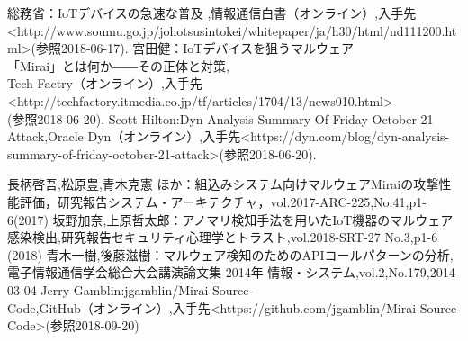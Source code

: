 
\begin{thebibliography}{10}
		総務省：IoTデバイスの急速な普及 ,情報通信白書（オンライン）,入手先\textless http://www.soumu.go.jp/johotsusintokei/whitepaper/ja/h30/html/nd111200.html\textgreater(参照2018-06-17).
        宮田健：IoTデバイスを狙うマルウェア\\「Mirai」とは何か――その正体と対策,\\Tech Factry（オンライン）,入手先\textless http:\slash\slash{}techfactory.itmedia.co.jp\slash{}tf\slash{}articles\slash{}1704\slash{}13\slash{}news010.html\textgreater\\(参照2018-06-20).
       Scott Hilton:Dyn Analysis Summary Of Friday October 21 Attack,Oracle Dyn（オンライン）,入手先\textless https:\slash\slash{}dyn.com\slash{}blog\slash{}dyn-analysis-summary-of-friday-october-21-attack\textgreater (参照2018-06-20).

    	長柄啓吾,松原豊,青木克憲 ほか：組込みシステム向けマルウェアMiraiの攻撃性能評価，研究報告システム・アーキテクチャ，vol.2017-ARC-225,No.41,p1-6(2017)
        坂野加奈,上原哲太郎：アノマリ検知手法を用いたIoT機器のマルウェア感染検出,研究報告セキュリティ心理学とトラスト,vol.2018-SRT-27 No.3,p1-6 (2018)
     	青木一樹,後藤滋樹：マルウェア検知のためのAPIコールパターンの分析,電子情報通信学会総合大会講演論文集 2014年 情報・システム,vol.2,No.179,2014-03-04
     Jerry Gamblin:jgamblin/Mirai-Source-\\Code,GitHub（オンライン）,入手先\textless https://github.com/jgamblin/Mirai-Source-Code\textgreater(参照2018-09-20)
\end{thebibliography}
